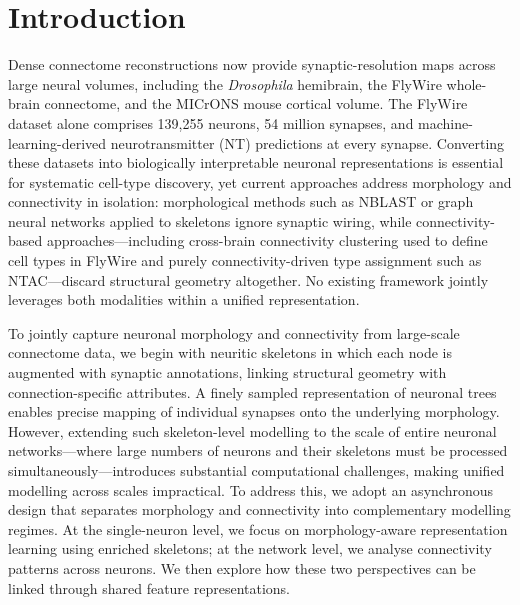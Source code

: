 \documentclass[10pt]{article}
\begin{document}
\section*{Introduction}
Dense connectome reconstructions now provide synaptic-resolution maps across large neural volumes, including the \textit{Drosophila} hemibrain\cite{scheffer2020hemibrain}, the FlyWire whole-brain connectome\cite{dorkenwald2024flywire,schlegel2024flywire}, and the MICrONS mouse cortical volume\cite{microns2021cortical}. The FlyWire dataset alone comprises 139,255 neurons, 54 million synapses, and machine-learning-derived neurotransmitter (NT) predictions at every synapse\cite{eckstein2020neurotransmitter}. Converting these datasets into biologically interpretable neuronal representations 
is essential for systematic cell-type discovery, yet current approaches address 
morphology and connectivity in isolation: morphological methods such as 
NBLAST\cite{costa2016nblast} or graph neural networks applied to 
skeletons\cite{li2023gnn_neuro} ignore synaptic wiring, while connectivity-based 
approaches---including cross-brain connectivity clustering used to define cell 
types in FlyWire\cite{schlegel2024flywire} and purely connectivity-driven type 
assignment such as NTAC\cite{schwartzman2026ntac}---discard structural geometry 
altogether. No existing framework jointly leverages both modalities within a 
unified representation.

To jointly capture neuronal morphology and connectivity from large-scale connectome data, we begin with neuritic skeletons in which each node is augmented with synaptic annotations, linking structural geometry with connection-specific attributes. A finely sampled representation of neuronal trees enables precise mapping of individual synapses onto the underlying morphology. However, extending such skeleton-level modelling to the scale of entire neuronal networks---where large numbers of neurons and their skeletons must be processed simultaneously---introduces substantial computational challenges, making unified modelling across scales impractical. To address this, we adopt an asynchronous design that separates morphology and connectivity into complementary modelling regimes. At the single-neuron level, we focus on morphology-aware representation learning using enriched skeletons; at the network level, we analyse connectivity patterns across neurons. We then explore how these two perspectives can be linked through shared feature representations.
\end{document}
